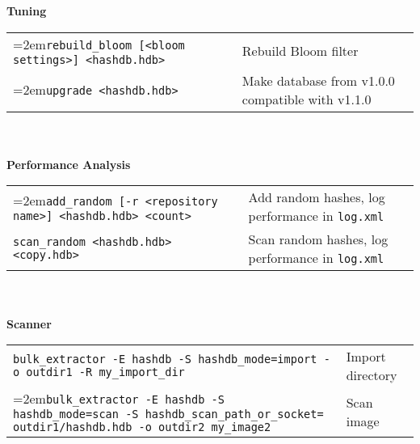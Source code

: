 \begin{small}
\begin{footnotesize}
\textbf{Tuning}\\
\begin{tabular}{p{3.6 in} p{3.0 in}}
\hangindent=2em\texttt{rebuild\_bloom [<bloom settings>] <hashdb.hdb>} & Rebuild Bloom filter \\
\hangindent=2em\texttt{upgrade <hashdb.hdb>} & Make database from v1.0.0 compatible with v1.1.0\\
\end{tabular}
\\
\\
\textbf{Performance Analysis}\\
\begin{tabular}{p{3.6 in} p{4 in}}
\hangindent=2em\texttt{add\_random [-r <repository name>] <hashdb.hdb> <count>} & Add random hashes, log performance in \texttt{log.xml}\\
\texttt{scan\_random <hashdb.hdb> <copy.hdb>} & Scan random hashes, log performance in \texttt{log.xml}\\
\end{tabular}
\\
\\
\textbf{\bulk Scanner}\\
\begin{tabular}{p{5.6 in} p{2 in}}
\texttt{bulk\_extractor -E hashdb -S hashdb\_mode=import -o outdir1 -R my\_import\_dir} & Import directory\\
\hangindent=2em\texttt{bulk\_extractor -E hashdb -S hashdb\_mode=scan -S hashdb\_scan\_path\_or\_socket= outdir1/hashdb.hdb -o outdir2 my\_image2} & Scan image\\
\end{tabular}
\end{footnotesize}
\end{small}


